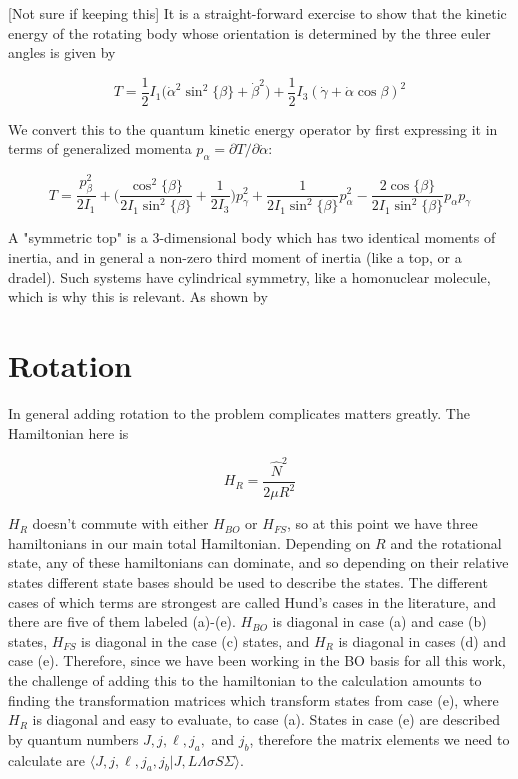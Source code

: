 \documentclass[prl, longbibliography]{revtex4-2}
\begin{document}
[Not sure if keeping this]
It is a straight-forward exercise to show that the kinetic energy of the rotating body whose orientation is determined by the three euler angles is given by

$$
T=\frac{1}{2}I_1\Big(\dot{\alpha}^2 \sin^2\{\beta\}+\dot{\beta}^2\Big)
+\frac{1}{2}I_3(\dot{\gamma}+\dot{\alpha}\cos{\beta})^2
$$

We convert this to the quantum kinetic energy operator by first expressing it in terms of generalized momenta $p_\alpha=\partial T/\partial \dot{\alpha}$:

$$
T = \frac{p_\beta^2}{2I_1} + \Big(\frac{\cos^2\{\beta\}}{2I_1 \sin^2\{\beta\}}+\frac{1}{2I_3}\Big)p_\gamma^2+\frac{1}{2I_1 \sin^2\{\beta\}}p_\alpha^2-\frac{2\cos\{\beta\}}{2I_1 \sin^2\{\beta\}}p_\alpha p_\gamma
$$

A "symmetric top" is a 3-dimensional body which has two identical moments of inertia, and in general a non-zero third moment of inertia (like a top, or a dradel). Such systems have cylindrical symmetry, like a homonuclear molecule, which is why this is relevant. As shown by 

\section{Rotation}

In general adding rotation to the problem complicates matters greatly. The Hamiltonian here is

\begin{equation}
H_R = \frac{\hat{N}^2}{2\mu R^2}
\end{equation}

$H_R$ doesn't commute with either $H_{BO}$ or $H_{FS}$, so at this point we have three hamiltonians in our main total Hamiltonian. Depending on $R$ and the rotational state, any of these hamiltonians can dominate, and so depending on their relative states different state bases should be used to describe the states. The different cases of which terms are strongest are called Hund's cases in the literature, and there are five of them labeled (a)-(e). $H_{BO}$ is diagonal in case (a) and case (b) states, $H_{FS}$ is diagonal in the case (c) states, and $H_R$ is diagonal in cases (d) and case (e). Therefore, since we have been working in the BO basis for all this work, the challenge of adding this to the hamiltonian to the calculation amounts to finding the transformation matrices which transform states from case (e), where $H_R$ is diagonal and easy to evaluate, to case (a). States in case (e) are described by quantum numbers $J, j, \ell, j_a, $ and $j_b$, therefore the matrix elements we need to calculate are $\langle J, j, \ell, j_a, j_b|J, L\Lambda\sigma S \Sigma\rangle$.
\end{document}
